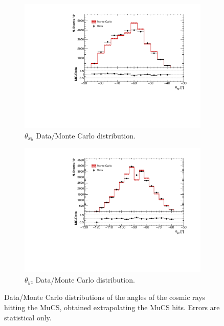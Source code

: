 \documentclass[a4paper]{scrartcl}
\begin{document}
\begin{figure}[htbp]
\begin{subfigure}{0.52\textwidth}
\includegraphics[width=\linewidth]{xy_mucs.pdf}
\caption{$\theta_{xy}$ Data/Monte Carlo distribution.} \label{fig:xy_mucs}
\end{subfigure}
\begin{subfigure}{0.52\textwidth}
\includegraphics[width=\linewidth]{yz_mucs.pdf}
\caption{$\theta_{yz}$ Data/Monte Carlo distribution.} \label{fig:yzmucs}
\end{subfigure}
\caption{Data/Monte Carlo distributions of the angles of the cosmic rays hitting the MuCS, obtained extrapolating the MuCS hits. Errors are statistical only.} \label{fig:mucs_angles}


\end{figure}
\end{document}
